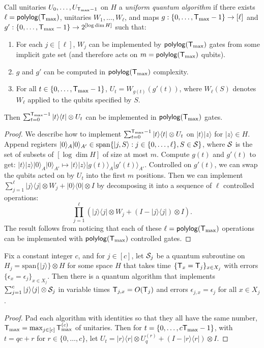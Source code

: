 \documentclass{theoretics}
\def\ket#1{{\lvert}#1\rangle}
\def\bra#1{{\langle}#1\rvert}
\renewcommand{\>}{\rangle}
\newcommand{\<}{\langle}
\renewcommand{\(}{\left(}
\renewcommand{\)}{\right)}
\begin{document}
\begin{lemma}\label{lem:uniform-alg}
Call unitaries $U_0,\dots,U_{{\sf T}_{\max}-1}$ on $H$ a \emph{uniform quantum algorithm} if
there exists $\ell={\sf polylog}({\sf T}_{\max})$, unitaries $W_1,\dots,W_{\ell}$, and maps $g:\{0,\dots,{\sf T}_{\max}-1\}\rightarrow[\ell]$ and $g':\{0,\dots,{\sf T}_{\max}-1\}\rightarrow 2^{[\log\dim H]}$ such that:
\begin{enumerate}
\item For each $j\in [\ell]$, $W_j$ can be implemented by ${\sf polylog}({\sf T}_{\max})$ gates from some implicit gate set (and therefore acts on $m={\sf polylog}({\sf T}_{\max})$ qubits).
\item $g$ and $g'$ can be computed in ${\sf polylog}({\sf T}_{\max})$ complexity.
\item For all $t\in\{0,\dots,{\sf T}_{\max}-1\}$, $U_t = W_{g(t)}(g'(t))$, where $W_{\ell}(S)$ denotes $W_{\ell}$ applied to the qubits specified by $S$.
\end{enumerate}
Then $\sum_{t=0}^{{\sf T}_{\max}-1}\ket{t}\bra{t}\otimes U_t$ can be implemented in ${\sf polylog}({\sf T}_{\max})$ gates. 
\end{lemma}
\begin{proof}
We describe how to implement $\sum_{t=0}^{{\sf T}_{\max}-1}\ket{t}\bra{t}\otimes U_t$ on $\ket{t}\ket{z}$ for $\ket{z}\in H$. 
Append registers $\ket{0}_A\ket{0}_{A'}\in\mathrm{span}\{\ket{j,S}:j\in \{0,\dots,\ell\}, S\in {\cal S}\}$, where ${\cal S}$ is the set of subsets of $[\log\dim H]$ of size at most $m$. 
Compute $g(t)$ and $g'(t)$ to get:
$\ket{t}\ket{z}\ket{0}_A\ket{0}_{A'}\mapsto \ket{t}\ket{z}\ket{g(t)}_A\ket{g'(t)}_{A'}.$
Controlled on $g'(t)$, we can swap the qubits acted on by $U_t$ into the first $m$ positions. Then we can implement $\sum_{j=1}^{\ell}\ket{j}\bra{j}\otimes W_j+\ket{0}\bra{0}\otimes I$ by decomposing it into a sequence of $\ell$ controlled operations:
$$\textstyle{\displaystyle\prod}_{j=1}^{\ell}\left(\ket{j}\bra{j}\otimes W_j+(I-\ket{j}\bra{j})\otimes I\right).$$
The result follows from noticing that each of these $\ell={\sf polylog}({\sf T}_{\max})$ operations can be implemented with ${\sf polylog}({\sf T}_{\max})$ controlled gates.
\end{proof}

\begin{lemma}\label{lem:uniform-combine}
Fix a constant integer $c$, and for $j\in [c]$, let ${\cal S}_j$ be a quantum subroutine on $H_j=\mathrm{span}\{\ket{j}\}\otimes H$ for some space $H$ that takes time $\{{\sf T}_x={\sf T}_j\}_{x\in X_j}$ with errors $\{\epsilon_x=\epsilon_j\}_{x\in X_j}$. Then there is a quantum algorithm that implements $\sum_{j=1}^c\ket{j}\bra{j}\otimes {\cal S}_j$ in variable times ${\sf T}_{j,x}=O({\sf T}_j)$ and errors $\epsilon_{j,x}=\epsilon_j$ for all $x\in X_j$.
\end{lemma}
\begin{proof}
Pad each algorithm with identities so that they all have the same number, ${\sf T}_{\max}=\max_{j\in [c]}{\sf T}_{\max}^{(c)}$ of unitaries. Then for $t=\{0,\dots,c{\sf T}_{\max}-1\}$, with $t=qc+r$ for $r\in\{0,\dots,c\}$, let $U_t= \ket{r}\bra{r}\otimes U_q^{(r)}+(I-\ket{r}\bra{r})\otimes I$. 
\end{proof}
\end{document}
